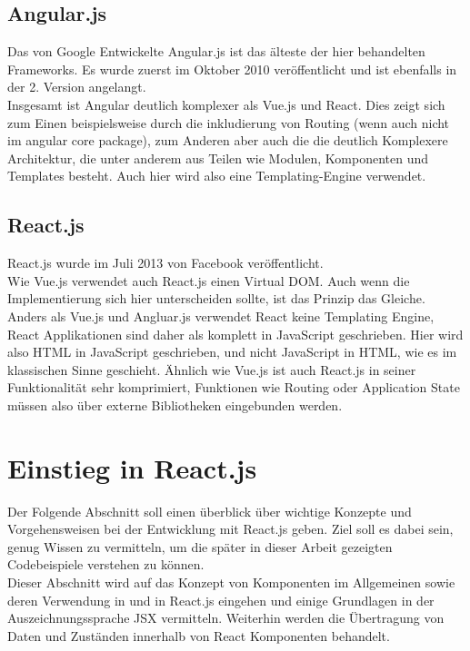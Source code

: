 \subsection{Angular.js}
Das von Google Entwickelte Angular.js ist das älteste der hier behandelten Frameworks. Es wurde zuerst im Oktober 2010 veröffentlicht und ist ebenfalls in der 2. Version angelangt.\\
Insgesamt ist Angular deutlich komplexer als  Vue.js und React. Dies zeigt sich zum Einen beispielsweise durch die inkludierung von Routing (wenn auch nicht im angular core package), zum Anderen aber auch die die deutlich Komplexere Architektur, die unter anderem aus Teilen wie Modulen, Komponenten und Templates besteht. Auch hier wird also eine Templating-Engine verwendet.

\subsection{React.js}
React.js wurde im Juli 2013 von Facebook veröffentlicht.\\
Wie Vue.js verwendet auch React.js einen Virtual DOM. Auch wenn die Implementierung sich hier unterscheiden sollte, ist das Prinzip das Gleiche.
Anders als Vue.js und Angluar.js verwendet React keine Templating Engine, React Applikationen sind daher als komplett in JavaScript geschrieben. Hier wird also HTML in JavaScript geschrieben, und nicht JavaScript in HTML, wie es im klassischen Sinne geschieht.
Ähnlich wie Vue.js ist auch React.js in seiner Funktionalität sehr komprimiert, Funktionen wie Routing oder Application State müssen also über externe Bibliotheken eingebunden werden.

\section{Einstieg in React.js}
Der Folgende Abschnitt soll einen überblick über wichtige Konzepte und Vorgehensweisen bei der Entwicklung mit React.js geben. Ziel soll es dabei sein, genug Wissen zu vermitteln, um die später in dieser Arbeit gezeigten Codebeispiele verstehen zu können.\\
Dieser Abschnitt wird auf das Konzept von Komponenten im Allgemeinen sowie deren Verwendung in und in React.js eingehen und einige Grundlagen in der Auszeichnungssprache JSX vermitteln. Weiterhin werden die Übertragung von Daten und Zuständen innerhalb von React Komponenten behandelt.

